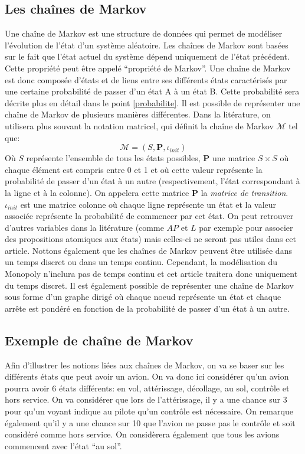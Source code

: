 \documentclass[letterpaper]{article}
\begin{document}
  \subsection{Les chaînes de Markov}
    \label{def_chaine_markov}
    Une chaîne de Markov est une structure de données qui permet de modéliser l'évolution
    de l'état d'un système aléatoire.  Les chaînes de Markov sont basées sur le 
    fait que l'état actuel du système dépend uniquement de l'état précédent.
    Cette propriété peut être appelé ``propriété de Markov''.  Une chaîne de
    Markov est donc composée d'états et de liens entre ses différents états caractérisés
    par une certaine probabilité de passer d'un état A à un état B.
    Cette probabilité sera décrite plus en détail dans le point \ref{probabilite}.
    Il est possible de représenter une chaîne de Markov de plusieurs manières différentes.
    Dans la litérature, on utilisera plus souvant la notation matricel, qui définit la
    chaîne de Markov $\mathcal{M}$ tel que:
    $$\mathcal{M} = (S, \mathbf{P}, \iota_{init})$$
    Où $S$ représente l'ensemble de tous les états possibles, $\mathbf{P}$ une matrice $S \times S$
    où chaque élément est compris entre 0 et 1 et où cette valeur représente la probabilité 
    de passer d'un état à un autre (respectivement, l'état correspondant à la ligne et à la colonne).
    On appelera cette matrice $\mathbf{P}$ la \textit{matrice de transition}.
    $\iota_{init}$ est une matrice colonne où chaque ligne représente un état et la valeur
    associée représente la probabilité de commencer par cet état.  On peut retrouver d'autres
    variables dans la litérature (comme $AP$ et $L$ par exemple pour associer des propositions 
    atomiques aux états) mais celles-ci ne seront pas utiles dans cet article.
    Nottons également que les chaînes de Markov peuvent être utilisée
    dans un temps discret ou dans un temps continu.  Cependant, la modélisation
    du Monopoly n'inclura pas de temps continu et cet article traitera donc uniquement
    du temps discret.
    Il est également possible de représenter une chaîne de Markov sous forme
    d'un graphe dirigé où chaque noeud représente un état et chaque arrête est pondéré
    en fonction de la probabilité de passer d'un état à un autre.
    
  \subsection{Exemple de chaîne de Markov}
    Afin d'illustrer les notions liées aux chaînes de Markov, on va se baser sur 
    les différents états que peut avoir un avion.  On va donc ici considérer 
    qu'un avion pourra avoir 6 états différents: en vol, attérissage, décollage, 
    au sol, contrôle et hors service.
    On va considérer que lors de l'attérissage, il y a une chance sur 3 pour qu'un
    voyant indique au pilote qu'un contrôle est nécessaire. On remarque également 
    qu'il y a une chance sur 10 que l'avion ne passe pas le contrôle et soit considéré 
    comme hors service.  On considèrera également que tous les avions commencent
    avec l'état ``au sol''.
    
\end{document}
